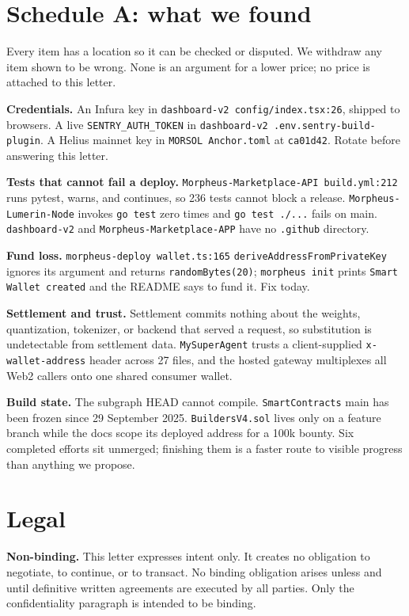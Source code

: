 \documentclass[11pt,a4paper]{article}
\newcommand{\code}[1]{\texttt{\small #1}}
\begin{document}
\section*{Schedule A: what we found}

Every item has a location so it can be checked or disputed. We withdraw any item
shown to be wrong. None is an argument for a lower price; no price is attached to
this letter.

\noindent\textbf{Credentials.} An Infura key in \code{dashboard-v2
config/index.tsx:26}, shipped to browsers. A live \code{SENTRY\_AUTH\_TOKEN} in
\code{dashboard-v2 .env.sentry-build-plugin}. A Helius mainnet key in
\code{MORSOL Anchor.toml} at \code{ca01d42}. Rotate before answering this letter.

\noindent\textbf{Tests that cannot fail a deploy.} \code{Morpheus-Marketplace-API
build.yml:212} runs pytest, warns, and continues, so 236 tests cannot block a
release. \code{Morpheus-Lumerin-Node} invokes \code{go test} zero times and
\code{go test ./...} fails on main. \code{dashboard-v2} and
\code{Morpheus-Marketplace-APP} have no \code{.github} directory.

\noindent\textbf{Fund loss.} \code{morpheus-deploy wallet.ts:165}
\code{deriveAddressFromPrivateKey} ignores its argument and returns
\code{randomBytes(20)}; \code{morpheus init} prints \code{Smart Wallet created}
and the README says to fund it. Fix today.

\noindent\textbf{Settlement and trust.} Settlement commits nothing about the
weights, quantization, tokenizer, or backend that served a request, so
substitution is undetectable from settlement data. \code{MySuperAgent} trusts a
client-supplied \code{x-wallet-address} header across 27 files, and the hosted
gateway multiplexes all Web2 callers onto one shared consumer wallet.

\noindent\textbf{Build state.} The subgraph HEAD cannot compile.
\code{SmartContracts} main has been frozen since 29 September 2025.
\code{BuildersV4.sol} lives only on a feature branch while the docs scope its
deployed address for a 100k bounty. Six completed efforts sit unmerged; finishing
them is a faster route to visible progress than anything we propose.

\section*{Legal}

\noindent\textbf{Non-binding.} This letter expresses intent only. It creates no
obligation to negotiate, to continue, or to transact. No binding obligation
arises unless and until definitive written agreements are executed by all
parties. Only the confidentiality paragraph is intended to be binding.
\end{document}
